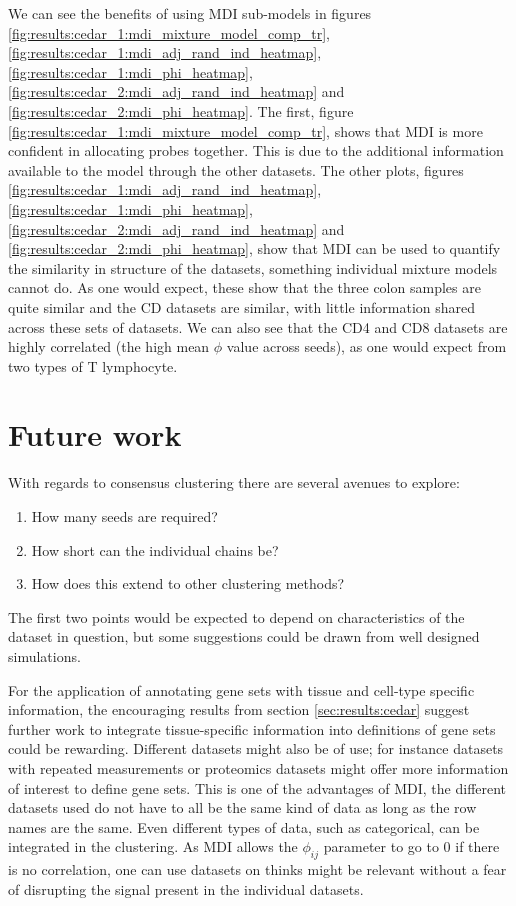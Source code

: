 \documentclass[12pt]{article} %
\begin{document}
	We can see the benefits of using MDI sub-models in figures \ref{fig:results:cedar_1:mdi_mixture_model_comp_tr}, \ref{fig:results:cedar_1:mdi_adj_rand_ind_heatmap}, \ref{fig:results:cedar_1:mdi_phi_heatmap}, \ref{fig:results:cedar_2:mdi_adj_rand_ind_heatmap} and \ref{fig:results:cedar_2:mdi_phi_heatmap}. The first, figure \ref{fig:results:cedar_1:mdi_mixture_model_comp_tr}, shows that MDI is more confident in allocating probes together. This is due to the additional information available to the model through the other datasets. The other plots, figures \ref{fig:results:cedar_1:mdi_adj_rand_ind_heatmap}, \ref{fig:results:cedar_1:mdi_phi_heatmap}, \ref{fig:results:cedar_2:mdi_adj_rand_ind_heatmap} and \ref{fig:results:cedar_2:mdi_phi_heatmap}, show that MDI can be used to quantify the similarity in structure of the datasets, something individual mixture models cannot do. As one would expect, these show that the three colon samples are quite similar and the CD datasets are similar, with little information shared across these sets of datasets. We can also see that the CD4 and CD8 datasets are highly correlated (the high mean $\phi$ value across seeds), as one would expect from two types of T lymphocyte.
	
	\section{Future work}
	With regards to consensus clustering there are several avenues to explore:
	\begin{enumerate}
		\item How many seeds are required?
		\item How short can the individual chains be?
		\item How does this extend to other clustering methods?
	\end{enumerate}
	The first two points would be expected to depend on characteristics of the dataset in question, but some suggestions could be drawn from well designed simulations.
	
	For the application of annotating gene sets with tissue and cell-type specific information, the encouraging results from section \ref{sec:results:cedar} suggest further work to integrate tissue-specific information into definitions of gene sets could be rewarding. Different datasets might also be of use; for instance datasets with repeated measurements or proteomics datasets might offer more information of interest to define gene sets. This is one of the advantages of MDI, the different datasets used do not have to all be the same kind of data as long as the row names are the same. Even different types of data, such as categorical, can be integrated in the clustering. As MDI allows the $\phi_{ij}$ parameter to go to 0 if there is no correlation, one can use datasets on thinks might be relevant without a fear of disrupting the signal present in the individual datasets.
	
\end{document}
